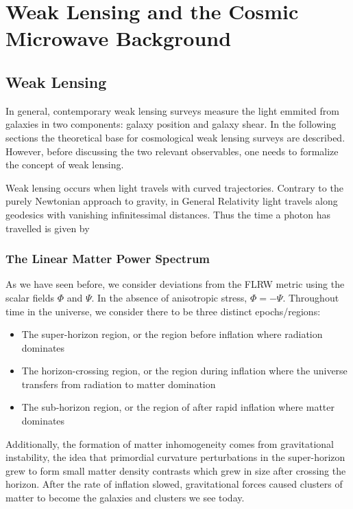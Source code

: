 \chapter{Weak Lensing and the Cosmic Microwave Background}

\section{Weak Lensing}

In general, contemporary weak lensing surveys measure the light emmited from galaxies in two components: galaxy position and galaxy shear. In the following sections the theoretical base for cosmological weak lensing surveys are described. However, before discussing the two relevant observables, one needs to formalize the concept of weak lensing.

Weak lensing occurs when light travels with curved trajectories. Contrary to the purely Newtonian approach to gravity, in General Relativity light travels along geodesics with vanishing infinitessimal distances. Thus the time a photon has travelled is given by

\subsection{The Linear Matter Power Spectrum}

As we have seen before, we consider deviations from the FLRW metric using the scalar fields $\Phi$ and $\Psi$. In the absence of anisotropic stress, $\Phi=-\Psi$. Throughout time in the universe, we consider there to be three distinct epochs/regions:
\begin{itemize}
	\item The super-horizon region, or the region before inflation where radiation dominates
	\item The horizon-crossing region, or the region during inflation where the universe transfers from radiation to matter domination
	\item The sub-horizon region, or the region of after rapid inflation where matter dominates
\end{itemize}
Additionally, the formation of matter inhomogeneity comes from gravitational instability, the idea that primordial curvature perturbations in the super-horizon grew to form small matter density contrasts which grew in size after crossing the horizon. After the rate of inflation slowed, gravitational forces caused clusters of matter to become the galaxies and clusters we see today.

